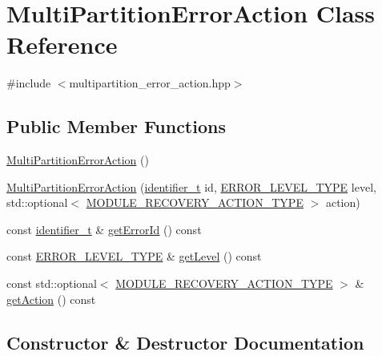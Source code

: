\hypertarget{classMultiPartitionErrorAction}{}\section{Multi\+Partition\+Error\+Action Class Reference}
\label{classMultiPartitionErrorAction}


{\ttfamily \#include $<$multipartition\+\_\+error\+\_\+action.\+hpp$>$}

\subsection*{Public Member Functions}
\begin{DoxyCompactItemize}
\item 
\hyperlink{classMultiPartitionErrorAction_ad0e3519e58d3597c4342d1b59ba38e16}{Multi\+Partition\+Error\+Action} ()
\item 
\hyperlink{classMultiPartitionErrorAction_a2929365688b8ec9a4c2ae651fe53067c}{Multi\+Partition\+Error\+Action} (\hyperlink{general__types_8hpp_a824b78b06da8112c2772bc666a63638d}{identifier\+\_\+t} id, \hyperlink{apex__error_8h_aa4da4218c0e2dcb8c37ea7a6cb5bd515}{E\+R\+R\+O\+R\+\_\+\+L\+E\+V\+E\+L\+\_\+\+T\+Y\+PE} level, std\+::optional$<$ \hyperlink{apex__error_8h_aecf7a2a9c5fb5be7125e5c9eb6d67023}{M\+O\+D\+U\+L\+E\+\_\+\+R\+E\+C\+O\+V\+E\+R\+Y\+\_\+\+A\+C\+T\+I\+O\+N\+\_\+\+T\+Y\+PE} $>$ action)
\item 
const \hyperlink{general__types_8hpp_a824b78b06da8112c2772bc666a63638d}{identifier\+\_\+t} \& \hyperlink{classMultiPartitionErrorAction_a26cda49163dda4bc49ff048f7a3aef2f}{get\+Error\+Id} () const 
\item 
const \hyperlink{apex__error_8h_aa4da4218c0e2dcb8c37ea7a6cb5bd515}{E\+R\+R\+O\+R\+\_\+\+L\+E\+V\+E\+L\+\_\+\+T\+Y\+PE} \& \hyperlink{classMultiPartitionErrorAction_ad7844aeeb60be3b1bbdf325a9388c62b}{get\+Level} () const 
\item 
const std\+::optional$<$ \hyperlink{apex__error_8h_aecf7a2a9c5fb5be7125e5c9eb6d67023}{M\+O\+D\+U\+L\+E\+\_\+\+R\+E\+C\+O\+V\+E\+R\+Y\+\_\+\+A\+C\+T\+I\+O\+N\+\_\+\+T\+Y\+PE} $>$ \& \hyperlink{classMultiPartitionErrorAction_a307acddf9991c4f4822de7a3341056f1}{get\+Action} () const 
\end{DoxyCompactItemize}


\subsection{Constructor \& Destructor Documentation}
